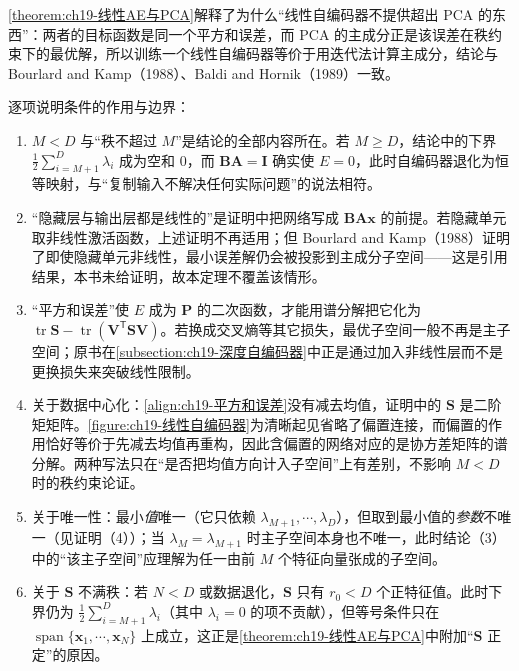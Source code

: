 \documentclass[../../main.tex]{subfiles}
\begin{document}
\begin{remark}
\cref{theorem:ch19-线性AE与PCA}解释了为什么“线性自编码器不提供超出 PCA 的东西”：两者的目标函数是同一个平方和误差，而 PCA 的主成分正是该误差在秩约束下的最优解，所以训练一个线性自编码器等价于用迭代法计算主成分，结论与 Bourlard and Kamp（1988）、Baldi and Hornik（1989）一致。

逐项说明条件的作用与边界：
\begin{enumerate}[(1)]
\item $M<D$ 与“秩不超过 $M$”是结论的全部内容所在。若 $M\geqslant D$，结论中的下界 $\frac{1}{2}\sum_{i=M+1}^{D}\lambda_i$ 成为空和 $0$，而 $\bm{B}\bm{A}=\bm{I}$ 确实使 $E=0$，此时自编码器退化为恒等映射，与“复制输入不解决任何实际问题”的说法相符。
\item “隐藏层与输出层都是线性的”是证明中把网络写成 $\bm{B}\bm{A}\bm{x}$ 的前提。若隐藏单元取非线性激活函数，上述证明不再适用；但 Bourlard and Kamp（1988）证明了即使隐藏单元非线性，最小误差解仍会被投影到主成分子空间——这是引用结果，本书未给证明，故本定理不覆盖该情形。
\item “平方和误差”使 $E$ 成为 $\bm{P}$ 的二次函数，才能用谱分解把它化为 $\operatorname{tr}\bm{S}-\operatorname{tr}(\bm{V}^{\mathsf T}\bm{S}\bm{V})$。若换成交叉熵等其它损失，最优子空间一般不再是主子空间；原书在\cref{subsection:ch19-深度自编码器}中正是通过加入非线性层而不是更换损失来突破线性限制。
\item 关于数据中心化：\eqref{align:ch19-平方和误差}没有减去均值，证明中的 $\bm{S}$ 是二阶矩矩阵。\cref{figure:ch19-线性自编码器}为清晰起见省略了偏置连接，而偏置的作用恰好等价于先减去均值再重构，因此含偏置的网络对应的是协方差矩阵的谱分解。两种写法只在“是否把均值方向计入子空间”上有差别，不影响 $M<D$ 时的秩约束论证。
\item 关于唯一性：最小\emph{值}唯一（它只依赖 $\lambda_{M+1},\cdots,\lambda_D$），但取到最小值的\emph{参数}不唯一（见证明（4））；当 $\lambda_M=\lambda_{M+1}$ 时主子空间本身也不唯一，此时结论（3）中的“该主子空间”应理解为任一由前 $M$ 个特征向量张成的子空间。
\item 关于 $\bm{S}$ 不满秩：若 $N<D$ 或数据退化，$\bm{S}$ 只有 $r_0<D$ 个正特征值。此时下界仍为 $\frac{1}{2}\sum_{i=M+1}^{D}\lambda_i$（其中 $\lambda_i=0$ 的项不贡献），但等号条件只在 $\operatorname{span}\{\bm{x}_1,\cdots,\bm{x}_N\}$ 上成立，这正是\cref{theorem:ch19-线性AE与PCA}中附加“$\bm{S}$ 正定”的原因。
\end{enumerate}
\end{remark}
\end{document}
